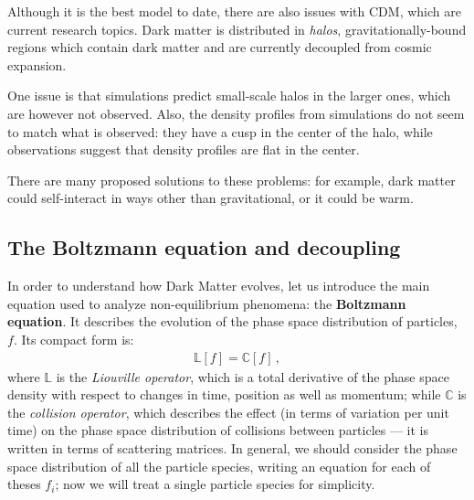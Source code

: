 \documentclass[main.tex]{subfiles}
\begin{document}
Although it is the best model to date, there are also issues with CDM, which are current research topics.
Dark matter is distributed in \emph{halos}, gravitationally-bound regions which contain dark matter and are currently decoupled from cosmic expansion.

One issue is that simulations predict small-scale halos in the larger ones, which are however not observed.
Also, the density profiles from simulations do not seem to match what is observed: they have a cusp in the center of the halo, while observations suggest that density profiles are flat in the center.

There are many proposed solutions to these problems: for example, dark matter could self-interact in ways other than gravitational, or it could be warm.






\subsection{The Boltzmann equation and decoupling}

In order to understand how Dark Matter evolves, let us introduce the main equation used to analyze non-equilibrium phenomena: the \textbf{Boltzmann equation}. It describes the evolution of the phase space distribution of particles, \(f\). Its compact form is:
%
\begin{align}
  \mathbb{L} [f] = \mathbb{C} [f]
\,,
\end{align}
%
where \(\mathbb{L}\) is the \emph{Liouville operator}, which is a total derivative of the phase space density with respect to changes in time, position as well as momentum; while \(\mathbb{C}\) is the \emph{collision operator}, which describes the effect (in terms of variation per unit time) on the phase space distribution of collisions between particles --- it is written in terms of scattering matrices. 
In general, we should consider the phase space distribution of all the particle species, writing an equation for each of theses \(f_i\); now we will treat a single particle species for simplicity. 
\end{document}
